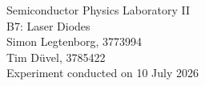 \begin{centering}
	\huge Semiconductor Physics Laboratory \RN{2}\\
	\LARGE B7: Laser Diodes\\
	\vspace{0.35cm}
	\normalsize Simon Legtenborg, 3773994 \\
	\normalsize Tim Düvel, 3785422 \\
	\normalsize Experiment conducted on 10 July 2026 \\
	\vspace{1cm}
\end{centering}
